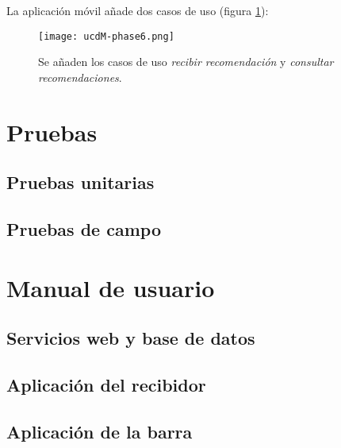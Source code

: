 La aplicación móvil añade dos casos de uso (figura \ref{fig:ucdM-phase6}):

  \begin{figure}[H]
    \begin{center}
      \texttt{[image: ucdM-phase6.png]}
      \caption{Se añaden los casos de uso \emph{recibir recomendación} y
      \emph{consultar recomendaciones}.}
      \label{fig:ucdM-phase6}
    \end{center}
  \end{figure}




\section{Pruebas}
  \subsection{Pruebas unitarias}
  \subsection{Pruebas de campo}

\section{Manual de usuario}
  \subsection{Servicios web y base de datos}
  \subsection{Aplicación del recibidor}
  \subsection{Aplicación de la barra}
